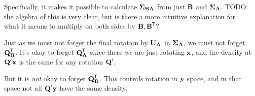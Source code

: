 Specifically, it makes it possible to calculate $\covmtxBA$ from just
$\mtxB$ and $\covmtxA$. TODO: the algebra of this is very clear, but is
there a more intuitive explanation for what it means to multiply on both
sides by $\mtxB, \mtxBt$?

Just as we must not forget the final rotation by $\mtxU\submA$ in
$\covmtxA$, we must not forget $\mtxQt\submB$. It's okay to forget
$\mtxQt\submA$ since there we are just rotating $\vecx$, and the density
at $\mtxQ' \vecx$ is the same for any rotation $\mtxQ'$.

But it is \emph{not} okay to forget $\mtxQt\submB$. This controls
rotation in $\vecy$ space, and in that space not all $\mtxQ' \vecy$ have
the same density.
